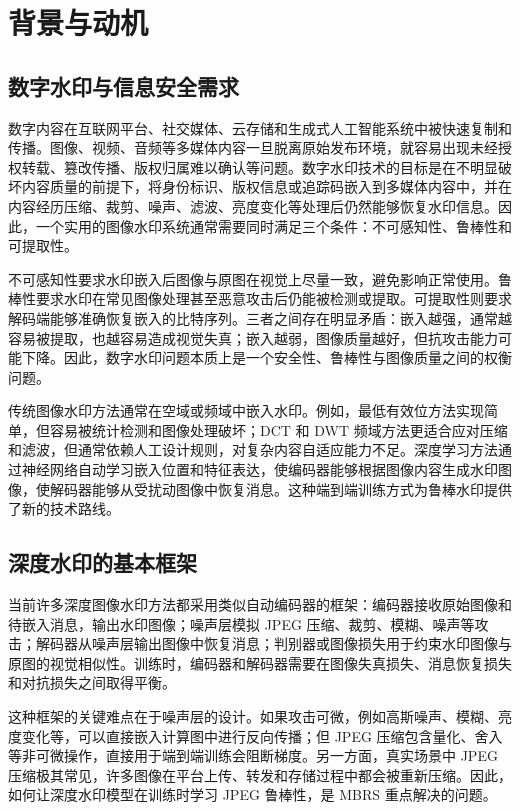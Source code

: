 ﻿\documentclass[UTF8,zihao=5]{ctexart}
\begin{document}
\section{背景与动机}

\subsection{数字水印与信息安全需求}

数字内容在互联网平台、社交媒体、云存储和生成式人工智能系统中被快速复制和传播。图像、视频、音频等多媒体内容一旦脱离原始发布环境，就容易出现未经授权转载、篡改传播、版权归属难以确认等问题。数字水印技术的目标是在不明显破坏内容质量的前提下，将身份标识、版权信息或追踪码嵌入到多媒体内容中，并在内容经历压缩、裁剪、噪声、滤波、亮度变化等处理后仍然能够恢复水印信息。因此，一个实用的图像水印系统通常需要同时满足三个条件：不可感知性、鲁棒性和可提取性。

不可感知性要求水印嵌入后图像与原图在视觉上尽量一致，避免影响正常使用。鲁棒性要求水印在常见图像处理甚至恶意攻击后仍能被检测或提取。可提取性则要求解码端能够准确恢复嵌入的比特序列。三者之间存在明显矛盾：嵌入越强，通常越容易被提取，也越容易造成视觉失真；嵌入越弱，图像质量越好，但抗攻击能力可能下降。因此，数字水印问题本质上是一个安全性、鲁棒性与图像质量之间的权衡问题。

传统图像水印方法通常在空域或频域中嵌入水印。例如，最低有效位方法实现简单，但容易被统计检测和图像处理破坏；DCT 和 DWT 频域方法更适合应对压缩和滤波，但通常依赖人工设计规则，对复杂内容自适应能力不足。深度学习方法通过神经网络自动学习嵌入位置和特征表达，使编码器能够根据图像内容生成水印图像，使解码器能够从受扰动图像中恢复消息。这种端到端训练方式为鲁棒水印提供了新的技术路线。

\subsection{深度水印的基本框架}

当前许多深度图像水印方法都采用类似自动编码器的框架：编码器接收原始图像和待嵌入消息，输出水印图像；噪声层模拟 JPEG 压缩、裁剪、模糊、噪声等攻击；解码器从噪声层输出图像中恢复消息；判别器或图像损失用于约束水印图像与原图的视觉相似性。训练时，编码器和解码器需要在图像失真损失、消息恢复损失和对抗损失之间取得平衡。

这种框架的关键难点在于噪声层的设计。如果攻击可微，例如高斯噪声、模糊、亮度变化等，可以直接嵌入计算图中进行反向传播；但 JPEG 压缩包含量化、舍入等非可微操作，直接用于端到端训练会阻断梯度。另一方面，真实场景中 JPEG 压缩极其常见，许多图像在平台上传、转发和存储过程中都会被重新压缩。因此，如何让深度水印模型在训练时学习 JPEG 鲁棒性，是 MBRS 重点解决的问题。
\end{document}
